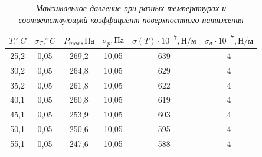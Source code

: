 \documentclass[a4paper, fontsize = 14pt]{article}
\begin{document}
\begin{table}[hbt]
\centering
\caption{\textit{Максимальное давление при разных температурах и соответствующмй коэффициент поверхностного натяжения}}
\begin{tabular}{|c|c|c|c|c|c|}
\hline
\textbf{$T, ^{\circ} C$} & \textbf{$\sigma_T, ^{\circ} C$} & \textbf{$P_{max}, Па$} & \textbf{$\sigma_p, Па$} & \textbf{$\sigma(T) \cdot 10^{-7}, Н/м$} & \textbf{$\sigma_{\sigma} \cdot 10^{-7}, Н/м$} \\ \hline
25,2                     & 0,05                            & 269,2                  & 10,05                   & 639                                     & 4                                             \\ \hline
30,2                     & 0,05                            & 264,8                  & 10,05                   & 629                                     & 4                                             \\ \hline
35,2                     & 0,05                            & 261,8                  & 10,05                   & 622                                     & 4                                             \\ \hline
40,1                     & 0,05                            & 260,8                  & 10,05                   & 619                                     & 4                                             \\ \hline
45,1                     & 0,05                            & 253,9                  & 10,05                   & 603                                     & 4                                             \\ \hline
50,1                     & 0,05                            & 250,6                  & 10,05                   & 595                                     & 4                                             \\ \hline
55,1                     & 0,05                            & 247,6                  & 10,05                   & 588                                     & 4                                             \\ \hline
\end{tabular}
\end{table}
\end{document}
